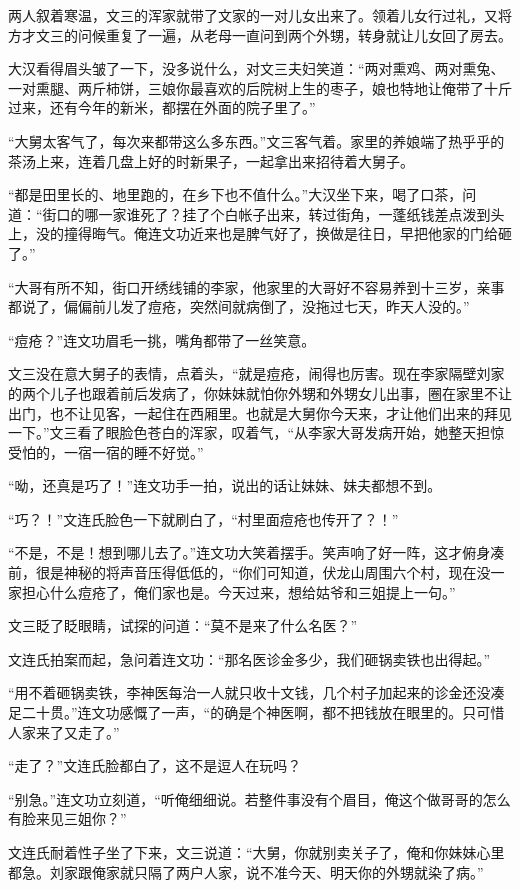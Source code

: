 两人叙着寒温，文三的浑家就带了文家的一对儿女出来了。领着儿女行过礼，又将方才文三的问候重复了一遍，从老母一直问到两个外甥，转身就让儿女回了房去。

大汉看得眉头皱了一下，没多说什么，对文三夫妇笑道：“两对熏鸡、两对熏兔、一对熏腿、两斤柿饼，三娘你最喜欢的后院树上生的枣子，娘也特地让俺带了十斤过来，还有今年的新米，都摆在外面的院子里了。”

“大舅太客气了，每次来都带这么多东西。”文三客气着。家里的养娘端了热乎乎的茶汤上来，连着几盘上好的时新果子，一起拿出来招待着大舅子。

“都是田里长的、地里跑的，在乡下也不值什么。”大汉坐下来，喝了口茶，问道：“街口的哪一家谁死了？挂了个白帐子出来，转过街角，一蓬纸钱差点泼到头上，没的撞得晦气。俺连文功近来也是脾气好了，换做是往日，早把他家的门给砸了。”

“大哥有所不知，街口开绣线铺的李家，他家里的大哥好不容易养到十三岁，亲事都说了，偏偏前儿发了痘疮，突然间就病倒了，没拖过七天，昨天人没的。”

“痘疮？”连文功眉毛一挑，嘴角都带了一丝笑意。

文三没在意大舅子的表情，点着头，“就是痘疮，闹得也厉害。现在李家隔壁刘家的两个儿子也跟着前后发病了，你妹妹就怕你外甥和外甥女儿出事，圈在家里不让出门，也不让见客，一起住在西厢里。也就是大舅你今天来，才让他们出来的拜见一下。”文三看了眼脸色苍白的浑家，叹着气，“从李家大哥发病开始，她整天担惊受怕的，一宿一宿的睡不好觉。”

“呦，还真是巧了！”连文功手一拍，说出的话让妹妹、妹夫都想不到。

“巧？！”文连氏脸色一下就刷白了，“村里面痘疮也传开了？！”

“不是，不是！想到哪儿去了。”连文功大笑着摆手。笑声响了好一阵，这才俯身凑前，很是神秘的将声音压得低低的，“你们可知道，伏龙山周围六个村，现在没一家担心什么痘疮了，俺们家也是。今天过来，想给姑爷和三姐提上一句。”

文三眨了眨眼睛，试探的问道：“莫不是来了什么名医？”

文连氏拍案而起，急问着连文功：“那名医诊金多少，我们砸锅卖铁也出得起。”

“用不着砸锅卖铁，李神医每治一人就只收十文钱，几个村子加起来的诊金还没凑足二十贯。”连文功感慨了一声，“的确是个神医啊，都不把钱放在眼里的。只可惜人家来了又走了。”

“走了？”文连氏脸都白了，这不是逗人在玩吗？

“别急。”连文功立刻道，“听俺细细说。若整件事没有个眉目，俺这个做哥哥的怎么有脸来见三姐你？”

文连氏耐着性子坐了下来，文三说道：“大舅，你就别卖关子了，俺和你妹妹心里都急。刘家跟俺家就只隔了两户人家，说不准今天、明天你的外甥就染了病。”

